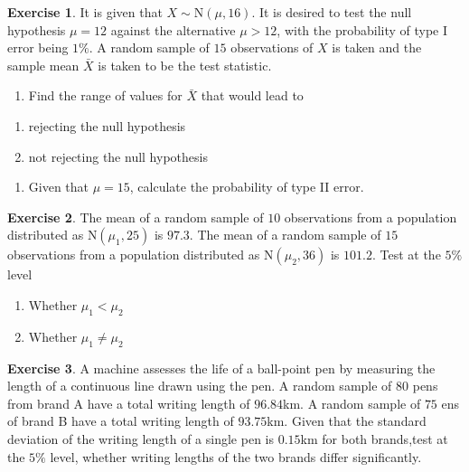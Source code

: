 \documentclass[
]{book}
\providecommand{\tightlist}{%
  \setlength{\itemsep}{0pt}\setlength{\parskip}{0pt}}
\theoremstyle{definition}
\theoremstyle{definition}
\theoremstyle{definition}
\newtheorem{exercise}{Exercise}[chapter]
\theoremstyle{definition}
\theoremstyle{remark}
\begin{document}
\begin{exercise}

It is given that \(X\sim\text{N}(\mu,16)\). It is desired to test the null hypothesis \(\mu=12\) against the alternative \(\mu>12\), with the probability of type I error being \(1\%\). A random sample of \(15\) observations of \(X\) is taken and the sample mean \(\bar{X}\) is taken to be the test statistic.

\begin{enumerate}
\def\labelenumi{\alph{enumi})}
\tightlist
\item
  Find the range of values for \(\bar{X}\) that would lead to
\end{enumerate}

\begin{enumerate}
\def\labelenumi{\roman{enumi}.}
\tightlist
\item
  rejecting the null hypothesis
\item
  not rejecting the null hypothesis
\end{enumerate}

\begin{enumerate}
\def\labelenumi{\alph{enumi})}
\setcounter{enumi}{1}
\tightlist
\item
  Given that \(\mu = 15\), calculate the probability of type II error.
\end{enumerate}

\end{exercise}

\begin{exercise}

The mean of a random sample of \(10\) observations from a population distributed as \(\text{N}(\mu_1,25)\) is \(97.3\). The mean of a random sample of \(15\) observations from a population distributed as \(\text{N}(\mu_2,36)\) is \(101.2\). Test at the \(5\%\) level

\begin{enumerate}
\def\labelenumi{(\roman{enumi})}
\item
  Whether \(\mu_1 < \mu_2\)
\item
  Whether \(\mu_1\neq\mu_2\)
\end{enumerate}

\end{exercise}

\begin{exercise}
A machine assesses the life of a ball-point pen by measuring the length of a continuous line drawn using the pen. A random sample of \(80\) pens from brand A have a total writing length of \(96.84\)km. A random sample of \(75\) ens of brand B have a total writing length of \(93.75\)km.
Given that the standard deviation of the writing length of a single pen is \(0.15\)km for both brands,test at the \(5\%\) level, whether writing lengths of the two brands differ significantly.
\end{exercise}
\end{document}
